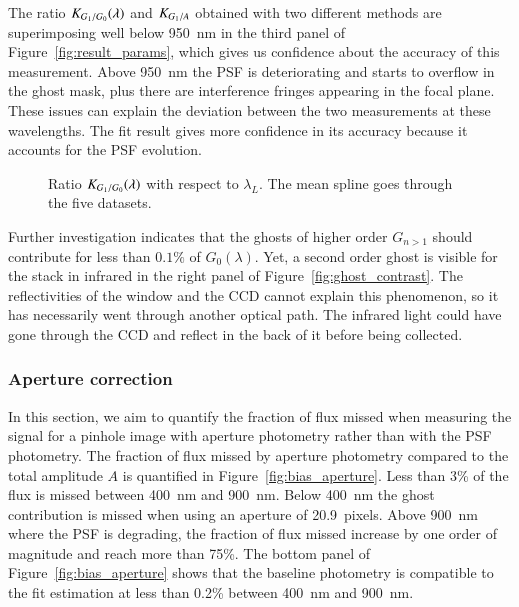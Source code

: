 The ratio $K_{G_1/G_0}(\lambda)$ and $K_{G_1/A}$ obtained with two different methods are superimposing well below \SI{950}{\nano\meter} in the third panel of Figure~\ref{fig:result_params}, which gives us confidence about the accuracy of this measurement. Above \SI{950}{\nano\meter} the PSF is deteriorating and starts to overflow in the ghost mask, plus there are interference fringes appearing in the focal plane. These issues can explain the deviation between the two measurements at these wavelengths. The fit result gives more confidence in its accuracy because it accounts for the PSF evolution.

\begin{figure}[h]
     \centering
     \caption{Ratio $K_{G_1/G_0}(\lambda)$ with respect to $\lambda_L$. The mean spline goes through the five datasets.}
     \label{fig:ghost_ratio}
\end{figure}

Further investigation indicates that the ghosts of higher order $G_{n>1}$ should contribute for less than $0.1\%$ of $G_0(\lambda)$. Yet, a second order ghost is visible for the stack in infrared in the right panel of Figure~\ref{fig:ghost_contrast}. The reflectivities of the window and the CCD cannot explain this phenomenon, so it has necessarily went through another optical path. The infrared light could have gone through the CCD and reflect in the back of it before being collected.

\subsubsection{Aperture correction}

In this section, we aim to quantify the fraction of flux missed when measuring the signal for a \spinhole pinhole image with aperture photometry rather than with the PSF photometry. The fraction of flux missed by aperture photometry compared to the total amplitude $A$ is quantified in Figure~\ref{fig:bias_aperture}. Less than 3\% of the flux is missed between \SI{400}{\nano\meter} and \SI{900}{\nano\meter}. Below \SI{400}{\nano\meter} the ghost contribution is missed when using an aperture of \SI{20.9}{pixels}. Above \SI{900}{\nano\meter} where the PSF is degrading, the fraction of flux missed increase by one order of magnitude and reach more than 75\%. The bottom panel of Figure~\ref{fig:bias_aperture} shows that the baseline photometry is compatible to the fit estimation at less than 0.2\% between \SI{400}{\nano\meter} and \SI{900}{\nano\meter}. 

